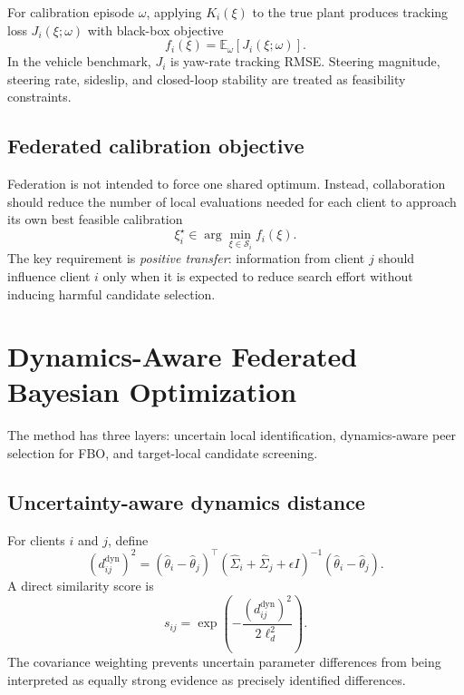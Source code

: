\documentclass[conference]{IEEEtran}
\newcommand{\distdyn}{d^{\mathrm{dyn}}}
\newcommand{\safeSet}{\mathcal{S}}
\begin{document}
For calibration episode $\omega$, applying $K_i(\xi)$ to the true plant produces tracking loss $J_i(\xi;\omega)$ with black-box objective
\begin{equation}
    f_i(\xi)=\mathbb{E}_\omega[J_i(\xi;\omega)].
\end{equation}
In the vehicle benchmark, $J_i$ is yaw-rate tracking RMSE. Steering magnitude, steering rate, sideslip, and closed-loop stability are treated as feasibility constraints.

\subsection{Federated calibration objective}
Federation is not intended to force one shared optimum. Instead, collaboration should reduce the number of local evaluations needed for each client to approach its own best feasible calibration
\begin{equation}
    \xi_i^\star\in\arg\min_{\xi\in\safeSet_i}f_i(\xi).
\end{equation}
The key requirement is \emph{positive transfer}: information from client $j$ should influence client $i$ only when it is expected to reduce search effort without inducing harmful candidate selection.

\section{Dynamics-Aware Federated Bayesian Optimization}
\label{sec:method}
The method has three layers: uncertain local identification, dynamics-aware peer selection for FBO, and target-local candidate screening.

\subsection{Uncertainty-aware dynamics distance}
For clients $i$ and $j$, define
\begin{equation}
    (\distdyn_{ij})^2=(\hat\theta_i-\hat\theta_j)^\top
    (\hat\Sigma_i+\hat\Sigma_j+\epsilon I)^{-1}
    (\hat\theta_i-\hat\theta_j).
    \label{eq:dyn_distance}
\end{equation}
A direct similarity score is
\begin{equation}
    s_{ij}=\exp\!\left(-\frac{(\distdyn_{ij})^2}{2\ell_d^2}\right).
\end{equation}
The covariance weighting prevents uncertain parameter differences from being interpreted as equally strong evidence as precisely identified differences.
\end{document}

